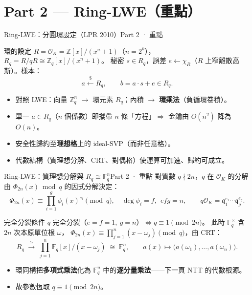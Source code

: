 \documentclass[aspectratio=169, 11pt]{beamer}
\newcommand{\Z}{\mathbb{Z}}
\newcommand{\F}{\mathbb{F}}
\newcommand{\OK}{\mathcal{O}_K}
\begin{document}
\section{Part 2 — Ring-LWE（重點）}

\begin{frame}{Ring-LWE：分圓環設定（LPR 2010）}{Part 2 · 重點}
  \begin{block}{環的設定}
    $R=\OK=\Z[x]/(x^n+1)$（$n=2^k$），$R_q=R/qR\cong\Z_q[x]/(x^n+1)$。
    秘密 $s\in R_q$，誤差 $e\leftarrow\chi_R$（$R$ 上窄離散高斯）。樣本：
    \[
      a \xleftarrow{\$} R_q,\qquad b = a\cdot s + e \in R_q.
    \]
  \end{block}
  \begin{itemize}\small
    \item 對照 LWE：向量 $\Z_q^n$ $\to$ 環元素 $R_q$；內積 $\to$ \textbf{環乘法}（負循環卷積）。
    \item 單一 $a\in R_q$（$n$ 個係數）即攜帶 $n$ 條「方程」$\Rightarrow$ 金鑰由 $O(n^2)$ 降為 $O(n)$。
    \item 安全性歸約至\textbf{理想格}上的 ideal-SVP（而非任意格）。
    \item 代數結構（質理想分解、CRT、對偶格）使運算可加速、歸約可成立。
  \end{itemize}
\end{frame}

\begin{frame}{Ring-LWE：質理想分解與 $R_q\cong\F_q^n$}{Part 2 · 重點}
  對質數 $q\nmid 2n$，$q$ 在 $\OK$ 的分解由 $\Phi_{2n}(x)\bmod q$ 的因式分解決定：
  \[
    \Phi_{2n}(x)\equiv\prod_{i=1}^{g}\phi_i(x)^{e_i}\!\!\pmod q,\quad \deg\phi_i=f,\ \ efg=n,
    \qquad q\OK=\mathfrak{q}_1^{e_1}\cdots\mathfrak{q}_g^{e_g}.
  \]
  \begin{block}{完全分裂條件}
    $q$ 完全分裂（$e=f=1,\ g=n$）$\iff q\equiv1\pmod{2n}$。
    此時 $\F_q^\times$ 含 $2n$ 次本原單位根 $\omega$，
    $\Phi_{2n}(x)\equiv\prod_{j=1}^n(x-\omega_j)\pmod q$，由 CRT：
    \[
      R_q\;\xrightarrow{\ \cong\ }\;\prod_{j=1}^n \F_q[x]/(x-\omega_j)\;\cong\;\F_q^n,
      \qquad a(x)\mapsto\bigl(a(\omega_1),\dots,a(\omega_n)\bigr).
    \]
  \end{block}
  \begin{itemize}\small
    \item 環同構把\textbf{多項式乘法}化為 $\F_q^n$ 中的\textbf{逐分量乘法}——下一頁 NTT 的代數根源。
    \item 故參數恆取 $q\equiv1\pmod{2n}$。
  \end{itemize}
\end{frame}
\end{document}
